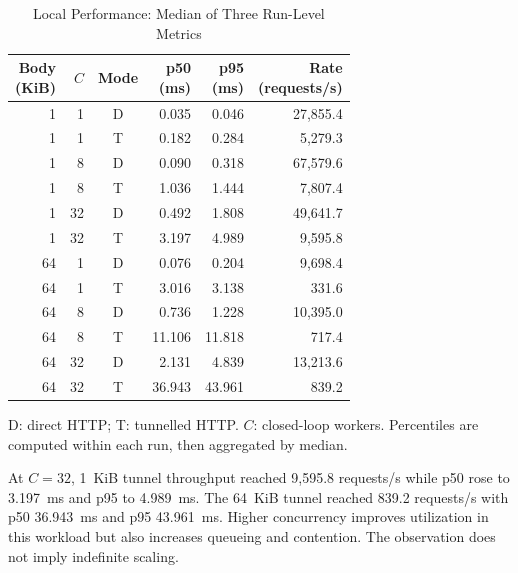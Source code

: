 \documentclass[conference,letterpaper]{IEEEtran}
\begin{document}
\begin{table}[!t]
\caption{Local Performance: Median of Three Run-Level Metrics}
\label{tab:performance}
\centering\footnotesize
\setlength{\tabcolsep}{3.5pt}
\begin{tabular}{@{}rrcrrr@{}}
\toprule
\shortstack{Body\\(KiB)} & $C$ & Mode &
\shortstack{p50\\(ms)} & \shortstack{p95\\(ms)} &
\shortstack{Rate\\(requests/s)}\\
\midrule
1 & 1 & D & 0.035 & 0.046 & 27,855.4\\
1 & 1 & T & 0.182 & 0.284 & 5,279.3\\
1 & 8 & D & 0.090 & 0.318 & 67,579.6\\
1 & 8 & T & 1.036 & 1.444 & 7,807.4\\
1 & 32 & D & 0.492 & 1.808 & 49,641.7\\
1 & 32 & T & 3.197 & 4.989 & 9,595.8\\
\midrule
64 & 1 & D & 0.076 & 0.204 & 9,698.4\\
64 & 1 & T & 3.016 & 3.138 & 331.6\\
64 & 8 & D & 0.736 & 1.228 & 10,395.0\\
64 & 8 & T & 11.106 & 11.818 & 717.4\\
64 & 32 & D & 2.131 & 4.839 & 13,213.6\\
64 & 32 & T & 36.943 & 43.961 & 839.2\\
\bottomrule
\end{tabular}
\par\smallskip
\begin{minipage}{.97\columnwidth}\footnotesize
D: direct HTTP; T: tunnelled HTTP. $C$: closed-loop workers.
Percentiles are computed within each run, then aggregated by median.
\end{minipage}
\end{table}

At $C=32$, 1~KiB tunnel throughput reached 9,595.8 requests/s while p50 rose
to 3.197~ms and p95 to 4.989~ms. The 64~KiB tunnel reached 839.2 requests/s
with p50 36.943~ms and p95 43.961~ms. Higher concurrency improves utilization
in this workload but also increases queueing and contention. The observation
does not imply indefinite scaling.
\end{document}
